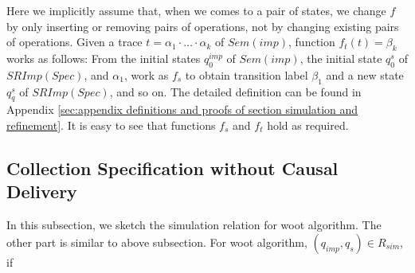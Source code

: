 {Here we implicitly assume that, when we comes to a pair of states, we change $f$ by only inserting or removing pairs of operations, not by changing existing pairs of operations. Given a trace $t = \alpha_1 \cdot \ldots \cdot \alpha_k$ of $\mathit{Sem}(\mathit{imp})$, function $f_t(t) = \beta_k$ works as follows: From the initial states $q_0^{\mathit{imp}}$ of $\mathit{Sem}(\mathit{imp})$, the initial state $q_0^{s}$ of $\mathit{SRImp}(\mathit{Spec})$, and $\alpha_1$, work as $f_s$ to obtain transition label $\beta_1$ and a new state $q_q^{s}$ of $\mathit{SRImp}(\mathit{Spec})$, and so on. The detailed definition can be found in Appendix \ref{sec:appendix definitions and proofs of section simulation and refinement}. It is easy to see that functions $f_s$ and $f_t$ hold as required. 
} 



\subsection{Collection Specification without Causal Delivery}
\label{subsec:collection specification without calusal delivery} 

In this subsection, we sketch the simulation relation for woot algorithm. The other part is similar to above subsection. For woot algorithm, $(q_{\mathit{imp}},q_s) \in R_{\mathit{sim}}$, if 


